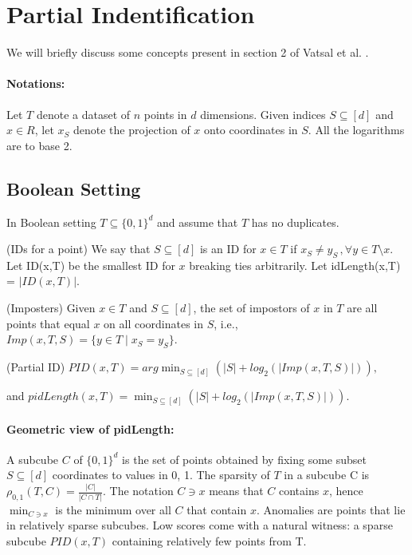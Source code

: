 \section{Partial Indentification}
\label{sec:partial-identification}

We will briefly discuss some concepts present in section 2 of Vatsal et al. \cite{NIPS2019_9710}. 

\paragraph{Notations:} Let $T$ denote a dataset of $n$ points in $d$ dimensions. Given indices $S \subseteq [d]$ and $x \in R$, let $x_S$ denote the projection of $x$ onto coordinates in $S$. All the logarithms are to base 2.

\subsection{Boolean Setting}
\label{subsec:boolean-setting}

In Boolean setting $T \subseteq \{0,1\}^d$ and assume that $T$ has no duplicates. 

\begin{defn}
    (IDs for a point) We say that $S \subseteq [d]$ is an ID for $x \in T$ if $x_S \neq y_S\,, \forall y \in T \setminus {x}$.
    Let ID(x,T) be the smallest ID for $x$ breaking ties arbitrarily. 
    Let idLength(x,T) = $\vert ID(x, T) \vert$.
\end{defn}

\begin{defn}
    (Imposters)  Given $x \in T$ and $S \subseteq [d]$, the set of   impostors of $x$ in $T$ are all points that equal $x$ on all coordinates in $S$, i.e., $Imp(x, T, S) = \{y \in T \mid x_S = y_S\}$.
\end{defn}

\begin{defn}
    (Partial ID) 
    $PID(x,T) = arg \min_{S \subseteq [d]} 
    (\vert S \vert + log_{2}(\vert Imp(x, T, S) \vert)),$

    and $pidLength(x,T) = \min_{S \subseteq [d]} 
    (\vert S \vert + log_{2}(\vert Imp(x, T, S) \vert)).$
\end{defn}
\pagebreak

\paragraph{Geometric view of pidLength: } 
A subcube $C$ of $\{0, 1\}^d$ is the set of points obtained by fixing some subset $S \subseteq [d]$ coordinates to values in 0, 1. 
The sparsity of $T$ in a subcube C is $\rho_{0,1}(T, C) = \frac{\vert C \vert}{\vert C \cap T\vert}$. 
The notation $C \ni x$ means that $C$ contains $x$, hence $\min_{C \ni x}$ is the minimum over all $C$ that contain $x$. Anomalies are points that lie in relatively sparse subcubes. Low scores come with a natural witness: a sparse subcube $PID(x, T)$ containing relatively few points from T.
